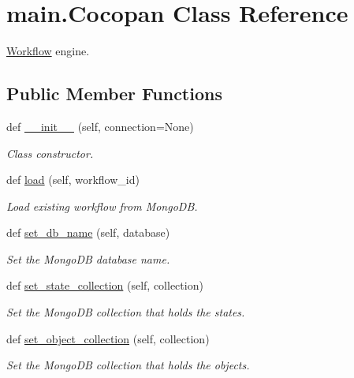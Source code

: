 \hypertarget{classmain_1_1_cocopan}{}\section{main.\+Cocopan Class Reference}
\label{classmain_1_1_cocopan}


\hyperlink{classmain_1_1_workflow}{Workflow} engine.  


\subsection*{Public Member Functions}
\begin{DoxyCompactItemize}
\item 
def \hyperlink{classmain_1_1_cocopan_a50aabe1c07574b61eb293272f1758bdb}{\+\_\+\+\_\+init\+\_\+\+\_\+} (self, connection=None)
\begin{DoxyCompactList}\small\item\em Class constructor. \end{DoxyCompactList}\item 
def \hyperlink{classmain_1_1_cocopan_ad8123cb7d7707b1d810fbdb6241019b5}{load} (self, workflow\+\_\+id)
\begin{DoxyCompactList}\small\item\em Load existing workflow from Mongo\+DB. \end{DoxyCompactList}\item 
def \hyperlink{classmain_1_1_cocopan_ab82e9e88bac256826e750485a64645ae}{set\+\_\+db\+\_\+name} (self, database)
\begin{DoxyCompactList}\small\item\em Set the Mongo\+DB database name. \end{DoxyCompactList}\item 
def \hyperlink{classmain_1_1_cocopan_a5a5b5a1bf8d0057b842e726a06fe8ecc}{set\+\_\+state\+\_\+collection} (self, collection)
\begin{DoxyCompactList}\small\item\em Set the Mongo\+DB collection that holds the states. \end{DoxyCompactList}\item 
def \hyperlink{classmain_1_1_cocopan_af17aa6d762d380aa8e3e9d75f906df3b}{set\+\_\+object\+\_\+collection} (self, collection)
\begin{DoxyCompactList}\small\item\em Set the Mongo\+DB collection that holds the objects. \end{DoxyCompactList}\item 

\end{DoxyCompactItemize}
